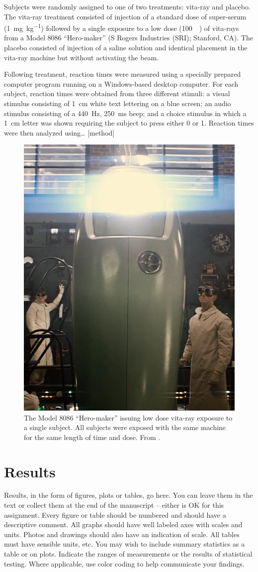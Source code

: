 \documentclass [twocolumn]{article}
\begin{document}
Subjects were randomly assigned to one of two treatments: vita-ray and placebo.  The vita-ray treatment consisted of injection of a standard dose of super-serum (\SI{1}{\milli\gram\per\kilo\gram}) followed by a single exposure to a low dose (\SI{100}{\milli\xavier}) of vita-rays from a Model 8086 ``Hero-maker” (S Rogers Industries (SRI); Stanford, CA).  The placebo consisted of injection of a saline solution and identical placement in the vita-ray machine but without activating the beam. 

Following treatment, reaction times were measured using a specially prepared computer program running on a Windows-based desktop computer.  For each subject, reaction times were obtained from three different stimuli: a visual stimulus consisting of \SI{1}{\centi\meter} white text lettering on a blue screen; an audio stimulus consisting of a \SI{440}{\hertz}, \SI{250}{\milli\second} beep; and a choice stimulus in which a \SI{1}{\centi\meter} letter was shown requiring the subject to press either 0 or 1.  Reaction times were then analyzed using… [method]
\begin{figure}
\begin{center}
\includegraphics[width=0.5\columnwidth]{Vita_Radiation.png}
\end{center}
\caption{The Model 8086 ``Hero-maker'' issuing low dose vita-ray exposure to a single subject. All subjects were exposed with the same machine for the same length of time and dose. From \citep{vitaradiation}.}
\end{figure}

\section{Results}
Results, in the form of figures, plots or tables, go here. You can leave them in the text or collect them at the end of the manuscript – either is OK for this assignment.  Every figure or table should be numbered and should have a descriptive comment.  All graphs should have well labeled axes with scales and units.  Photos and drawings should also have an indication of scale.  All tables must have sensible units, etc.  You may wish to include summary statistics as a table or on plots.  Indicate the ranges of measurements or the results of statistical testing.  Where applicable, use color coding to help communicate your findings. 
\end{document}
